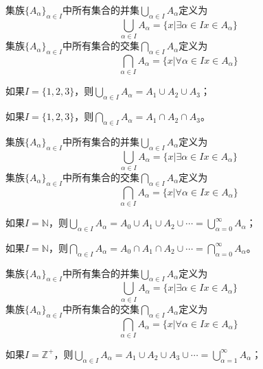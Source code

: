 \documentclass{beamer}
\begin{document}
\begin{CJK*}{UTF8}{gbsn}
\begin{frame}
  集族$\{A_{\alpha}\}_{\alpha \in I}$中所有集合的并集$\bigcup_{\alpha \in I}A_{\alpha}$定义为
  \[ \bigcup_{\alpha \in I}A_{\alpha} = \{x|\exists \alpha \in I  x \in A_{\alpha}\}\]
      集族$\{A_{\alpha}\}_{\alpha \in I}$中所有集合的交集$\bigcap_{\alpha \in I}A_{\alpha}$定义为
  \[ \bigcap_{\alpha \in I}A_{\alpha} = \{x|\forall \alpha \in I x \in A_{\alpha}\}\]
\pause
  \begin{Ex}
    如果$I=\{1,2,3\}$，则$\bigcup_{\alpha \in I}A_{\alpha} =A_1\cup A_2\cup A_3$；

    如果$I=\{1,2,3\}$，则$\bigcap_{\alpha \in I}A_{\alpha} =A_1\cap A_2\cap A_3$。
  \end{Ex}
\end{frame}

\begin{frame}
  集族$\{A_{\alpha}\}_{\alpha \in I}$中所有集合的并集$\bigcup_{\alpha \in I}A_{\alpha}$定义为
  \[ \bigcup_{\alpha \in I}A_{\alpha} = \{x|\exists \alpha \in I  x \in A_{\alpha}\}\]
      集族$\{A_{\alpha}\}_{\alpha \in I}$中所有集合的交集$\bigcap_{\alpha \in I}A_{\alpha}$定义为
  \[ \bigcap_{\alpha \in I}A_{\alpha} = \{x|\forall \alpha \in I x \in A_{\alpha}\}\]
\pause
  \begin{Ex}
    如果$I=\mathbb{N}$，则$\bigcup_{\alpha \in I}A_{\alpha} =A_0\cup A_1\cup A_2\cup\cdots=\bigcup_{\alpha=0}^{\infty}A_{\alpha}$；
    
    如果$I=\mathbb{N}$，则$\bigcap_{\alpha \in I}A_{\alpha} =A_0\cap A_1\cap A_2\cup\cdots=\bigcap_{\alpha=0}^{\infty}A_{\alpha}$。
  \end{Ex}
\end{frame}
\begin{frame}
  集族$\{A_{\alpha}\}_{\alpha \in I}$中所有集合的并集$\bigcup_{\alpha \in I}A_{\alpha}$定义为
  \[ \bigcup_{\alpha \in I}A_{\alpha} = \{x|\exists \alpha \in I  x \in A_{\alpha}\}\]
      集族$\{A_{\alpha}\}_{\alpha \in I}$中所有集合的交集$\bigcap_{\alpha \in I}A_{\alpha}$定义为
  \[ \bigcap_{\alpha \in I}A_{\alpha} = \{x|\forall \alpha \in I x \in A_{\alpha}\}\]
  \begin{Ex}
    如果$I=\mathbb{Z}^+$，则$\bigcup_{\alpha \in I}A_{\alpha} =A_1\cup A_2\cup A_3\cup\cdots=\bigcup_{\alpha=1}^{\infty}A_{\alpha}$；
    

\end{Ex}
\end{frame}
\end{CJK*}
\end{document}
